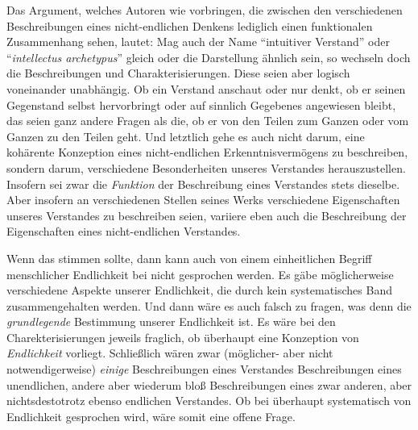 Das Argument, welches Autoren wie  vorbringen, die zwischen
den verschiedenen Beschreibungen eines nicht-endlichen Denkens lediglich einen funktionalen
Zusammenhang sehen, lautet: Mag auch der Name \enquote{intuitiver Verstand}
oder \enquote{\emph{intellectus archetypus}} gleich oder die Darstellung ähnlich
sein, so wechseln doch die Beschreibungen und Charakterisierungen. Diese seien aber logisch voneinander
unabhängig. Ob ein Verstand anschaut oder nur denkt, ob er seinen Gegenstand
selbst hervorbringt oder auf sinnlich Gegebenes angewiesen bleibt, das seien
ganz andere Fragen als die, ob er von den Teilen zum Ganzen oder
vom Ganzen zu den Teilen geht. Und letztlich gehe es  auch
nicht darum, eine kohärente Konzeption eines nicht-endlichen Erkenntnisvermögens
zu beschreiben, sondern darum, verschiedene Besonderheiten unseres Verstandes
herauszustellen. Insofern sei zwar die \emph{Funktion} der Beschreibung eines
 Verstandes stets dieselbe. Aber insofern an verschiedenen
Stellen seines Werks verschiedene Eigenschaften unseres Verstandes zu
beschreiben seien, variiere eben auch die Beschreibung der
Eigenschaften eines nicht-endlichen Verstandes.

Wenn das stimmen sollte, dann kann auch von einem einheitlichen Begriff
menschlicher Endlichkeit bei  nicht gesprochen werden. Es
gäbe möglicherweise verschiedene Aspekte unserer Endlichkeit, die durch kein
systematisches Band zusammengehalten werden. Und dann wäre es auch falsch zu
fragen, was denn die \emph{grundlegende} Bestimmung unserer Endlichkeit ist. Es
wäre bei den Charekterisierungen jeweils fraglich, ob überhaupt eine Konzeption von \emph{Endlichkeit}
vorliegt. Schließlich wären zwar (möglicher- aber nicht notwendigerweise)
\emph{einige} Beschreibungen eines  Verstandes
Beschreibungen eines unendlichen, andere aber wiederum bloß Beschreibungen eines
zwar anderen, aber nichtsdestotrotz ebenso endlichen Verstandes. Ob bei
 überhaupt systematisch von Endlichkeit gesprochen wird,
wäre somit eine offene Frage.

